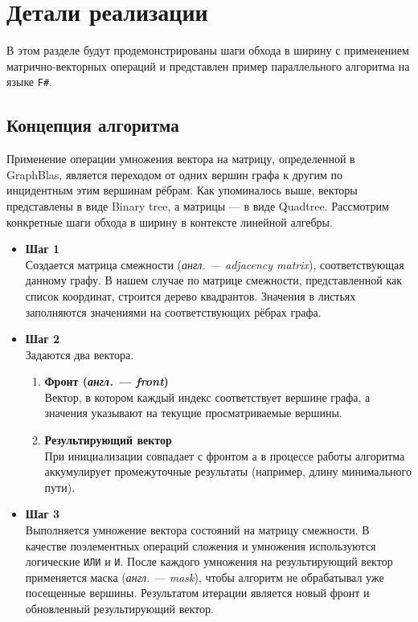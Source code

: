 
\section{Детали реализации}
\noindent В этом разделе будут продемонстрированы шаги обхода в ширину с применением матрично-векторных операций и представлен пример параллельного алгоритма на языке \texttt{F\#}.



\subsection{Концепция алгоритма}
\noindent Применение операции умножения вектора на матрицу, определенной в GraphBlas, является переходом от одних вершин графа к другим по инцидентным этим вершинам рёбрам.
Как упоминалось выше, векторы представлены в виде Binary tree, а матрицы --- в виде Quadtree. Рассмотрим конкретные шаги обхода в ширину в контексте линейной алгебры.
\begin{itemize}
    \item{\textbf{Шаг 1}} \\ 
    Создается матрица смежности (\textit{англ. --- adjacency matrix}), соответствующая данному графу. В нашем случае по матрице смежности, представленной как список координат, строится дерево квадрантов. Значения в листьях заполняются значениями на соответствующих рёбрах графа.
    \item{\textbf{Шаг 2}} \\ 
    Задаются два вектора.
    \begin{enumerate}
        \item{\textbf{Фронт (\textit{англ. --- front})}} \\
        Вектор, в котором каждый индекс соответствует вершине графа, а значения указывают на текущие просматриваемые вершины.
        \item{\textbf{Результирующий вектор}} \\ 
        При инициализации совпадает с фронтом а в процессе работы алгоритма аккумулирует промежуточные результаты (например, длину минимального пути).
    \end{enumerate}
    \item{\textbf{Шаг 3}} \\
    Выполняется умножение вектора состояний на матрицу смежности. В качестве поэлементных операций сложения и умножения используются логические \texttt{ИЛИ} и \texttt{И}. После каждого умножения на результирующий вектор применяется маска (\textit{англ. --- mask}), чтобы алгоритм не обрабатывал уже посещенные вершины. Результатом итерации является новый фронт и обновленный результирующий вектор.
\end{itemize}

